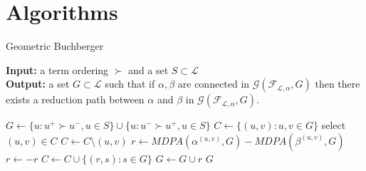 \documentclass[9pt]{beamer}
\newcommand\F{\mathcal{F}}
\newcommand\G{\mathcal{G}}
\newcommand\set[1]{\{#1\}}
\theoremstyle{definition}
\begin{document}
\section{Algorithms}

\begin{frame}[fragile]{Geometric Buchberger}
  
  \begin{algorithm}[H]
    \textbf{Input:} a term ordering $\succ$ and a set $S \subset \mathcal{L}$\\
    \textbf{Output:} a set $G \subset \mathcal{L}$ such that if $\alpha, \beta$
    are connected in $\G(\F_{\mathcal{L}, \alpha}, G)$ then there exists a reduction
    path between $\alpha$ and $\beta$ in $\G(\F_{\mathcal{L}, \alpha}, G)$.
    \begin{algorithmic}[1]
      \STATE $G \leftarrow \set{u : u^+ \succ u^-, u \in S} \cup \set{u : u^- \succ u^+, u \in S}$ 
      \STATE $C \leftarrow \set{(u,v) : u, v \in G}$
      \STATE select $(u, v) \in C$
      \STATE $C \leftarrow C \setminus (u,v)$
      \STATE $r \leftarrow MDPA(\alpha^{(u,v)}, G) - MDPA(\beta^{(u,v)}, G)$
      \STATE $r \leftarrow -r$
      \ENDIF
      \STATE $C \leftarrow C \cup \set{(r, s) : s \in G}$
      \STATE $G \leftarrow G \cup r$
      \ENDIF
      \ENDWHILE
      \RETURN $G$
    \end{algorithmic}
  \end{algorithm}

\end{frame}
\end{document}
